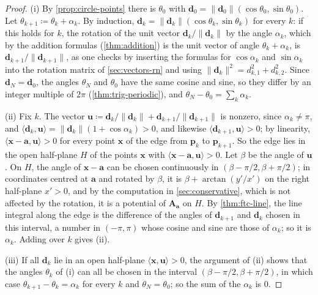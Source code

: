 \begin{proof}
(i) By \cref{prop:circle-points} there is $\theta_0$ with $\mathbf d_0=\|\mathbf d_0\|(\cos\theta_0,\sin\theta_0)$. Let $\theta_{k+1}\coloneqq\theta_k+\alpha_k$. By induction, $\mathbf d_k=\|\mathbf d_k\|(\cos\theta_k,\sin\theta_k)$ for every $k$: if this holds for $k$, the rotation of the unit vector $\mathbf d_k/\|\mathbf d_k\|$ by the angle $\alpha_k$, which by the addition formulas (\cref{thm:addition}) is the unit vector of angle $\theta_k+\alpha_k$, is $\mathbf d_{k+1}/\|\mathbf d_{k+1}\|$, as one checks by inserting the formulas for $\cos\alpha_k$ and $\sin\alpha_k$ into the rotation matrix of \cref{sec:vectors-rn} and using $\|\mathbf d_k\|^2=d_{k,1}^2+d_{k,2}^2$. Since $\mathbf d_N=\mathbf d_0$, the angles $\theta_N$ and $\theta_0$ have the same cosine and sine, so they differ by an integer multiple of $2\pi$ (\cref{thm:trig-periodic}), and $\theta_N-\theta_0=\sum_k\alpha_k$.

(ii) Fix $k$. The vector $\mathbf u\coloneqq\mathbf d_k/\|\mathbf d_k\|+\mathbf d_{k+1}/\|\mathbf d_{k+1}\|$ is nonzero, since $\alpha_k\ne\pi$, and $\langle\mathbf d_k,\mathbf u\rangle=\|\mathbf d_k\|(1+\cos\alpha_k)>0$, and likewise $\langle\mathbf d_{k+1},\mathbf u\rangle>0$; by linearity, $\langle\mathbf x-\mathbf a,\mathbf u\rangle>0$ for every point $\mathbf x$ of the edge from $\mathbf p_k$ to $\mathbf p_{k+1}$. So the edge lies in the open half-plane $H$ of the points $\mathbf x$ with $\langle\mathbf x-\mathbf a,\mathbf u\rangle>0$. Let $\beta$ be the angle of $\mathbf u$. On $H$, the angle of $\mathbf x-\mathbf a$ can be chosen continuously in $(\beta-\pi/2,\beta+\pi/2)$; in coordinates centred at $\mathbf a$ and rotated by $\beta$, it is $\beta+\arctan(y'/x')$ on the right half-plane $x'>0$, and by the computation in \cref{sec:conservative}, which is not affected by the rotation, it is a potential of $\mathbf A_{\mathbf a}$ on $H$. By \cref{thm:ftc-line}, the line integral along the edge is the difference of the angles of $\mathbf d_{k+1}$ and $\mathbf d_k$ chosen in this interval, a number in $(-\pi,\pi)$ whose cosine and sine are those of $\alpha_k$; so it is $\alpha_k$. Adding over $k$ gives (ii).

(iii) If all $\mathbf d_k$ lie in an open half-plane $\langle\mathbf x,\mathbf u\rangle>0$, the argument of (ii) shows that the angles $\theta_k$ of (i) can all be chosen in the interval $(\beta-\pi/2,\beta+\pi/2)$, in which case $\theta_{k+1}-\theta_k=\alpha_k$ for every $k$ and $\theta_N=\theta_0$; so the sum of the $\alpha_k$ is $0$.
\end{proof}

